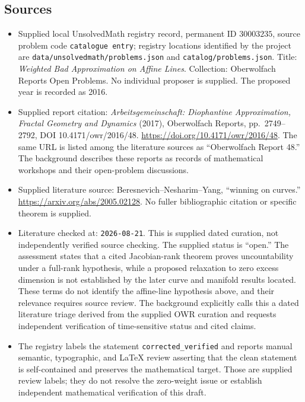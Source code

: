 \documentclass[11pt]{article}
\begin{document}
\subsection{Sources}
\begin{itemize}
\item Supplied local UnsolvedMath registry record, permanent ID \(30003235\), source problem code \texttt{catalogue entry}; registry locations identified by the project are \texttt{data/unsolvedmath/problems.json} and \texttt{catalog/problems.json}. Title: \emph{Weighted Bad Approximation on Affine Lines}. Collection: Oberwolfach Reports Open Problems. No individual proposer is supplied. The proposed year is recorded as 2016.
\item Supplied report citation: \emph{Arbeitsgemeinschaft: Diophantine Approximation, Fractal Geometry and Dynamics} (2017), Oberwolfach Reports, pp.\ 2749--2792, DOI 10.4171/owr/2016/48. \url{https://doi.org/10.4171/owr/2016/48}. The same URL is listed among the literature sources as ``Oberwolfach Report 48.'' The background describes these reports as records of mathematical workshops and their open-problem discussions.
\item Supplied literature source: Beresnevich--Nesharim--Yang, ``winning on curves.'' \url{https://arxiv.org/abs/2005.02128}. No fuller bibliographic citation or specific theorem is supplied.
\item Literature checked at: \texttt{2026-08-21}. This is supplied dated curation, not independently verified source checking. The supplied status is ``open.'' The assessment states that a cited Jacobian-rank theorem proves uncountability under a full-rank hypothesis, while a proposed relaxation to zero excess dimension is not established by the later curve and manifold results located. These terms do not identify the affine-line hypothesis above, and their relevance requires source review. The background explicitly calls this a dated literature triage derived from the supplied OWR curation and requests independent verification of time-sensitive status and cited claims.
\item The registry labels the statement \texttt{corrected\_verified} and reports manual semantic, typographic, and LaTeX review asserting that the clean statement is self-contained and preserves the mathematical target. Those are supplied review labels; they do not resolve the zero-weight issue or establish independent mathematical verification of this draft.
\end{itemize}
\end{document}
